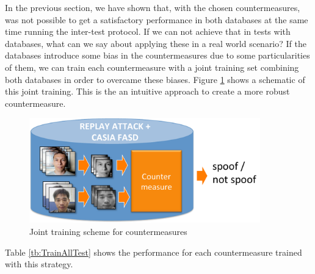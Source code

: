 In the previous section, we have shown that, with the chosen countermeasures, was not possible to get a satisfactory performance in both databases at the same time running the inter-test protocol. If we can not achieve that in tests with databases, what can we say about applying these in a real world scenario? If the databases introduce some bias in the countermeasures due to some particularities of them, we can train each countermeasure with a joint training set combining both databases in order to overcame these biases. Figure \ref{img:joint_training} shows a schematic of this joint training. This is the an intuitive approach to create a more robust countermeasure.

\begin{figure}[!htb]
\begin{center}
\includegraphics [width=10cm] {images/joint_training.pdf}
\caption{Joint training scheme for countermeasures} \label{img:joint_training}
\end{center}
\end{figure}



Table \ref{tb:TrainAllTest} shows the performance for each countermeasure trained with this strategy. %

